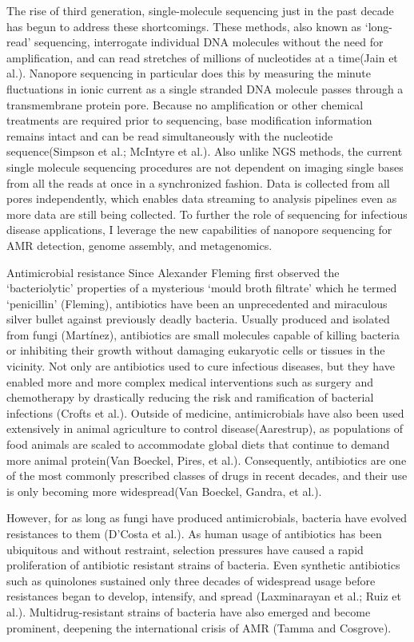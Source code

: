 The rise of third generation, single-molecule sequencing just in the past decade has begun to address these shortcomings. These methods, also known as ‘long-read’ sequencing, interrogate individual DNA molecules without the need for amplification, and can read stretches of millions of nucleotides at a time(Jain et al.). Nanopore sequencing in particular does this by measuring the minute fluctuations in ionic current as a single stranded DNA molecule passes through a transmembrane protein pore. Because no amplification or other chemical treatments are required prior to sequencing, base modification information remains intact and can be read simultaneously with the nucleotide sequence(Simpson et al.; McIntyre et al.). Also unlike NGS methods, the current single molecule sequencing procedures are not dependent on imaging single bases from all the reads at once in a synchronized fashion. Data is collected from all pores independently, which enables data streaming to analysis pipelines even as more data are still being collected. To further the role of sequencing for infectious disease applications, I leverage the new capabilities of nanopore sequencing for AMR detection, genome assembly, and metagenomics.

Antimicrobial resistance
Since Alexander Fleming first observed the ‘bacteriolytic’ properties of a mysterious ‘mould broth filtrate’ which he termed ‘penicillin’ (Fleming), antibiotics have been an unprecedented and miraculous silver bullet against previously deadly bacteria. Usually produced and isolated from fungi (Martínez), antibiotics are small molecules capable of killing bacteria or inhibiting their growth without damaging eukaryotic cells or tissues in the vicinity. Not only are antibiotics used to cure infectious diseases, but they have enabled more and more complex medical interventions such as surgery and chemotherapy by drastically reducing the risk and ramification of bacterial infections (Crofts et al.). Outside of medicine, antimicrobials have also been used extensively in animal agriculture to control disease(Aarestrup), as populations of food animals are scaled to accommodate global diets that continue to demand more animal protein(Van Boeckel, Pires, et al.). Consequently, antibiotics are one of the most commonly prescribed classes of drugs in recent decades, and their use is only becoming more widespread(Van Boeckel, Gandra, et al.).

However, for as long as fungi have produced antimicrobials, bacteria have evolved resistances to them (D’Costa et al.). As human usage of antibiotics has been ubiquitous and without restraint, selection pressures have caused a rapid proliferation of antibiotic resistant strains of bacteria. Even synthetic antibiotics such as quinolones sustained only three decades of widespread usage before resistances began to develop, intensify, and spread (Laxminarayan et al.; Ruiz et al.). Multidrug-resistant strains of bacteria have also emerged and become prominent, deepening the international crisis of AMR (Tamma and Cosgrove).

